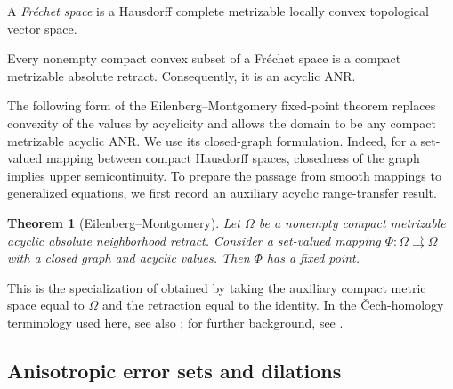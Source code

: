 \documentclass[11pt]{amsart}
\newtheorem{theorem}{Theorem}[section]
\theoremstyle{definition}
\theoremstyle{remark}
\newcommand{\tto}{\rightrightarrows}
\begin{document}
	A \emph{Fr\'echet space} is a Hausdorff complete metrizable locally convex
	topological vector space.
	
	Every nonempty compact convex subset of a Fr\'echet space is a compact
	metrizable absolute retract. Consequently, it is an acyclic ANR.
	
	The following form of the Eilenberg--Montgomery fixed-point theorem
	replaces convexity of the values by acyclicity and allows the domain
	to be any compact metrizable acyclic ANR. We use its closed-graph
	formulation. Indeed, for a set-valued mapping between compact Hausdorff
	spaces, closedness of the graph implies upper semicontinuity. To prepare the
	passage from smooth mappings to generalized equations, we
	first record an auxiliary acyclic range-transfer result.
	
	\begin{theorem}[Eilenberg--Montgomery]
		\label{thm:EM}
		Let $\Omega$ be a nonempty compact metrizable acyclic absolute
		neighborhood retract. Consider a set-valued mapping
		$\Phi:\Omega\tto\Omega$ with a closed graph and acyclic values.
		Then $\Phi$ has a fixed point.
	\end{theorem}
	
	This is the specialization of
	\cite[Theorem~1, p.~215]{EilenbergMontgomery} obtained by taking the
	auxiliary compact metric space equal to $\Omega$ and the retraction equal
	to the identity. In the \v{C}ech-homology terminology used here, see also
	\cite[Definition~32.1 and Corollary~32.12, pp.~159, 163]{Gorniewicz};
	for further background, see \cite{GranasDugundji}.
	
	\subsection{Anisotropic error sets and dilations}
	
\end{document}
